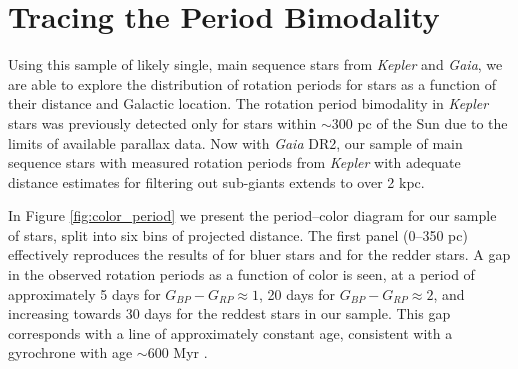 \documentclass[trackchanges,preprint2]{aastex62}
\newcommand{\Kepler}{\textsl{Kepler}\xspace}
\begin{document}
\section{Tracing the Period Bimodality}
\label{sec:bimodal}

Using this sample of likely single, main sequence stars from \Kepler and {\em Gaia}, we are able to explore the distribution of rotation periods for stars as a function of their distance and Galactic location. The rotation period bimodality in \Kepler stars was previously detected only for stars within $\sim$300 pc of the Sun due to the limits of available parallax data. Now with {\em Gaia} DR2, our sample of main sequence stars with measured rotation periods from \Kepler with adequate distance estimates for filtering out sub-giants extends to over 2 kpc.


In Figure \ref{fig:color_period} we present the period--color diagram for our sample of stars, split into six bins of projected distance. The first panel (0--350 pc) effectively reproduces the results of \citet{davenport2017} for bluer stars and \citet{mcquillan2014} for the redder stars. A gap in the observed rotation periods as a function of color is seen, at a period of approximately 5 days for $G_{BP}-G_{RP}\approx1$, 20 days for $G_{BP}-G_{RP}\approx2$, and increasing towards 30 days for the reddest stars in our sample. This gap corresponds with a line of approximately constant age, consistent with a gyrochrone with age $\sim$600 Myr \citep{davenport2017}. 
\end{document}
